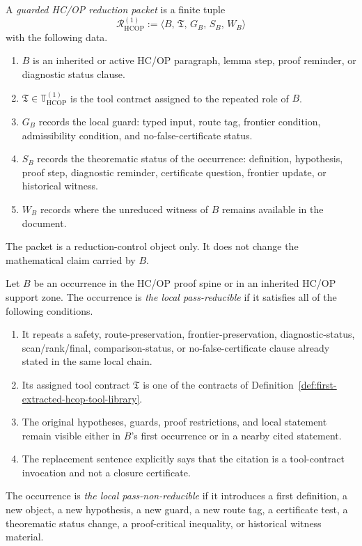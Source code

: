 \begin{definition}
\label{def:guarded-hcop-reduction-packet}
A \emph{guarded HC/OP reduction packet} is a finite tuple
\[
 \mathcal R_{\mathrm{HCOP}}^{(1)}
 :=
 \langle B,\, \mathfrak T,\, G_B,\, S_B,\, W_B\rangle
\]
with the following data.
\begin{enumerate}[leftmargin=2em,label=(\roman*)]
 \item \(B\) is an inherited or active HC/OP paragraph, lemma step, proof reminder, or diagnostic status clause.
 \item \(\mathfrak T\in\mathbb T_{\mathrm{HCOP}}^{(1)}\) is the tool contract assigned to the repeated role of \(B\).
 \item \(G_B\) records the local guard: typed input, route tag, frontier condition, admissibility condition, and no-false-certificate status.
 \item \(S_B\) records the theorematic status of the occurrence: definition, hypothesis, proof step, diagnostic reminder, certificate question, frontier update, or historical witness.
 \item \(W_B\) records where the unreduced witness of \(B\) remains available in the document.
\end{enumerate}
The packet is a reduction-control object only. It does not change the mathematical claim carried by \(B\).
\end{definition}

\begin{definition}
\label{def:reducible-and-nonreducible-hcop-occurrences}
Let \(B\) be an occurrence in the HC/OP proof spine or in an inherited HC/OP support zone. The occurrence is \emph{the local pass-reducible} if it satisfies all of the following conditions.
\begin{enumerate}[leftmargin=2em,label=(\roman*)]
 \item It repeats a safety, route-preservation, frontier-preservation, diagnostic-status, scan/rank/final, comparison-status, or no-false-certificate clause already stated in the same local chain.
 \item Its assigned tool contract \(\mathfrak T\) is one of the contracts of Definition~\ref{def:first-extracted-hcop-tool-library}.
 \item The original hypotheses, guards, proof restrictions, and local statement remain visible either in \(B\)'s first occurrence or in a nearby cited statement.
 \item The replacement sentence explicitly says that the citation is a tool-contract invocation and not a closure certificate.
\end{enumerate}
The occurrence is \emph{the local pass-non-reducible} if it introduces a first definition, a new object, a new hypothesis, a new guard, a new route tag, a certificate test, a theorematic status change, a proof-critical inequality, or historical witness material.
\end{definition}

